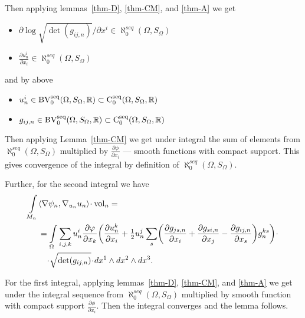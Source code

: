 Then applying lemmas~\ref{thm-D}, \ref{thm-CM}, and \ref{thm-A} we get

\begin{itemize}

\item $\partial \log \sqrt {\det (g_{ij,n})}/\partial x^i\in \aleph_0^{seq}(\Omega,S_\Omega)$

\item $\frac{\partial u_n^i}{\partial x_i}\in \aleph_0^{seq}(\Omega,S_\Omega)$
 
\end{itemize} 
 
 and by above
 
  \begin{itemize}
  
  \item ${u^i_n}\in  \operatorname{BV_0^{seq}}(\Omega,S_\Omega,\mathbb{R})\subset\operatorname{C_0^{seq}}(\Omega,S_\Omega,\mathbb{R})$ 
 
 \item $g_{i j,n}\in   \operatorname{BV_0^{seq}}(\Omega,S_\Omega,\mathbb{R})\subset \operatorname{C_0^{seq}}(\Omega,S_\Omega,\mathbb{R})$
 
  \end{itemize}
  
Then applying Lemma~\ref{thm-CM} we get under integral the sum of elements from $\aleph_0^{seq}(\Omega,S_\Omega)$ multiplied by $\frac{\partial \phi}{\partial x_i}$ --- smooth functions with compact support.
This gives convergence of the integral by definition of  $\aleph_0^{seq}(\Omega,S_\Omega)$.
              

Further, for the second integral %
we have
\begin{align*}
\int\limits_{M_n}&\<\nabla\psi_n,\nabla_{u_n} u_n\>\cdot\vol_n=\\
&=\int\limits_{\Omega}  \sum_{i,j,k}u^i_n \frac{\partial \phi}{\partial x_k}
\biggl(\frac{\partial u^k_n}{\partial x_i} +\tfrac{1}{2}u^j_n\sum_s
\biggl(\frac{\partial g_{ js,n}}{\partial x_i}+\frac{\partial g_{si,n}}{\partial x_j}-\frac{\partial g_{i j,n}}{\partial x_s}\biggr) g^{ks}_n\biggr)\cdot 
\\
&\quad\cdot\sqrt{\op{det}(g_{i j,n})}\cdot dx^1\wedge dx^2\wedge dx^3.
\end{align*}


For the first integral,
 applying
lemmas~\ref{thm-D}, \ref{thm-CM}, and \ref{thm-A} we get under the integral sequence from $\aleph_0^{seq}(\Omega,S_\Omega)$ multiplied by smooth function with compact support $\frac{\partial \phi}{\partial x_i}$. Then the integral converges and the lemma follows.
\qeds


